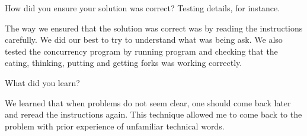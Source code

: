 \documentclass{article}
\newenvironment{question}[2][Question]{\begin{trivlist}
\item[\hskip \labelsep {\bfseries #1}\hskip \labelsep {\bfseries #2.}]}{\end{trivlist}}
\begin{document}

\vspace{0.25in} %

\begin{question}{3}
How did you ensure your solution was correct? Testing details, for instance.
\end{question}
The way we ensured that the solution was correct was by reading the instructions carefully. We did our best to try to understand what was being ask. We also tested the concurrency program by running program and checking that the eating, thinking, putting and getting forks was working correctly.



\vspace{0.25in}
\begin{question}{4}
What did you learn?
\end{question}
We learned that when problems do not seem clear, one should come back later and reread the instructions again. This technique allowed me to come back to the problem with prior experience of unfamiliar technical words.

\end{document}
